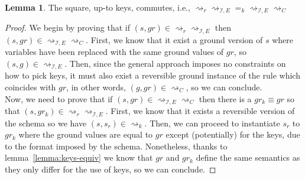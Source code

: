 \documentclass{article}[12pt,a4paper]
\theoremstyle{definition}
\newtheorem{lemma}{Lemma}
\begin{document}
\begin{lemma}
  The square, up-to keys, commutes, i.e., $\rightsquigarrow_r
  \rightsquigarrow_{\mathcal{I},E} =_k \rightsquigarrow_{\mathcal{I},E}
  \rightsquigarrow_C $
\end{lemma}
\begin{proof}
  We begin by proving that if $(s, gr) \in \rightsquigarrow_r
  \rightsquigarrow_{\mathcal{I},E} $ then $(s,gr) \in \rightsquigarrow_{\mathcal{I},E}
  \rightsquigarrow_C $. First, we know that it exist a ground version of $s$
  where variables have been replaced with the same ground values of $gr$, so
  $(s, g)\in \rightsquigarrow_{\mathcal{I},E}$. Then, since the general approach
  imposes no constraints on how to pick keys, it must also exist a reversible
  ground instance of the rule which coincides with $gr$, in other words, $(g,
  gr)\in \rightsquigarrow_C$, so we can conclude.\\

  Now, we need to prove that if $(s, gr) \in \rightsquigarrow_{\mathcal{I},E}
  \rightsquigarrow_C $ then there is a $gr_k\equiv gr$ so that $(s,gr_k) \in \rightsquigarrow_r
  \rightsquigarrow_{\mathcal{I},E}$. First, we know that it exists a reversible
  version of the schema so we have $(s, s_r)\in \rightsquigarrow_k$. Then, we
  can proceed to instantiate $s_r$ to $gr_k$ where the ground values are equal
  to $gr$ except (potentially) for the keys, due to the format imposed by the
  schema. Nonetheless, thanks to lemma~\ref{lemma:keys-equiv} we know that $gr$
  and $gr_k$ define the same semantics as they only differ for the use of keys, so we can conclude.

\end{proof}
\end{document}
